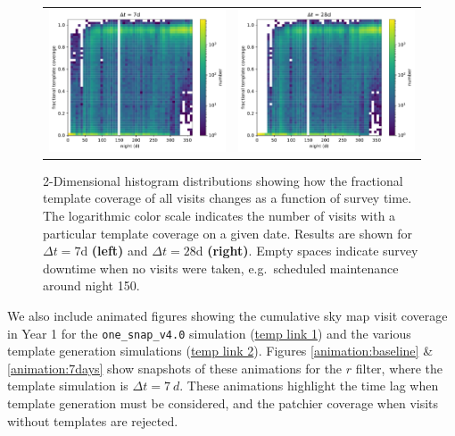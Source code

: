 \documentclass[preprintm,linenumbers]{aastex631}
\newcommand{\baseline}{\texttt{one\_snap\_v4.0}\xspace}
\begin{document}
  \begin{figure}
      \centering
      			\begin{tabular}{c c}
      \includegraphics[width=0.5\linewidth]{results/fractional_template_coverage_first_year_one_snap_v4_0_10yrs_db_noDD_noTwi_7_2d_hist.pdf} &
            \includegraphics[width=0.5\linewidth]{results/fractional_template_coverage_first_year_one_snap_v4_0_10yrs_db_noDD_noTwi_28_2d_hist.pdf} \\
\end{tabular}
\caption{2-Dimensional histogram distributions showing how the fractional template coverage of all visits changes as a function of survey time.
The logarithmic color scale indicates the number of visits with a particular template coverage on a given date. Results are shown for $\Delta t = 7$d \textbf{(left)} and $\Delta t = 28$d \textbf{(right)}.
Empty spaces indicate survey downtime when no visits were taken, e.g.\ scheduled maintenance around night 150.
}
\label{fig:fractional_template_coverage-2d}
  \end{figure}
  
		We also include animated figures showing the cumulative sky map visit coverage in Year 1 for the \baseline simulation (\href{update-links}{temp link 1}) and the various template generation simulations (\href{update-links}{temp link 2}). 
  Figures \ref{animation:baseline} \& \ref{animation:7days} show snapshots of these animations for the $r$ filter, where the template simulation is $\Delta t = 7\ \si{d}$.
		These animations highlight the time lag when template generation must be considered, and the patchier coverage when visits without templates are rejected.
		
\end{document}
